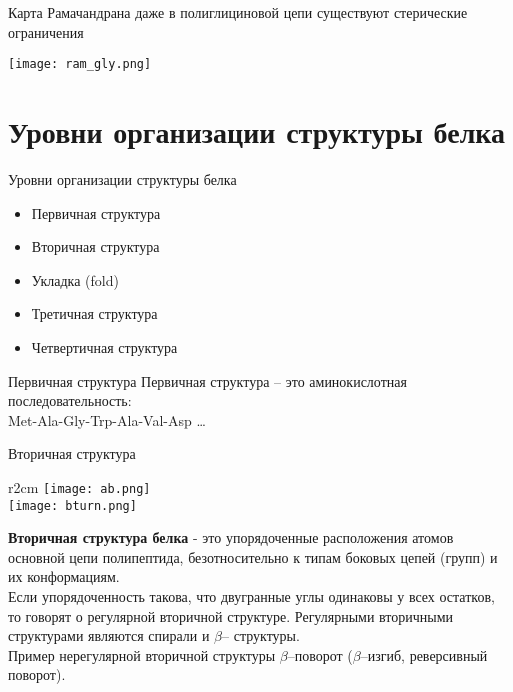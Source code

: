   \begin{frame}
{Карта Рамачандрана}
	  даже в полиглициновой цепи существуют стерические ограничения
	\begin{center}
          \texttt{[image: ram\_gly.png]}
	  \end{center}
  \end{frame}
 
  \section{Уровни организации структуры белка}
  \begin{frame}
{Уровни организации структуры белка}
	  \begin{itemize}
		  \item Первичная структура
		  \item Вторичная структура
		  \item Укладка (fold)
		  \item Третичная структура
		  \item Четвертичная структура
		  \end{itemize}
	  \end{frame}

  \begin{frame}
{Первичная структура}
	  Первичная структура – это аминокислотная последовательность:\\
	  \vspace{.5cm}
	  Met-Ala-Gly-Trp-Ala-Val-Asp \ldots
  \end{frame}

  \begin{frame}
{Вторичная структура}
	  \begin{wrapfigure}{r}{2cm}
	  \texttt{[image: ab.png]}\\
	  \texttt{[image: bturn.png]}
      \end{wrapfigure}
	  \textbf{Вторичная структура белка} - это упорядоченные расположения атомов основной цепи полипептида, 	 безотносительно к типам боковых цепей (групп) и их конформациям.\\
	  \vspace{.5cm}
	  Если упорядоченность такова, что двугранные углы
	  одинаковы у всех остатков, то говорят о
	  регулярной вторичной структуре. Регулярными
	  вторичными структурами являются спирали и $\beta$–
	  структуры.\\
	  \vspace{.7cm}
	  Пример нерегулярной вторичной структуры 
	  $\beta$–поворот ($\beta$–изгиб, реверсивный поворот).
  \end{frame}


